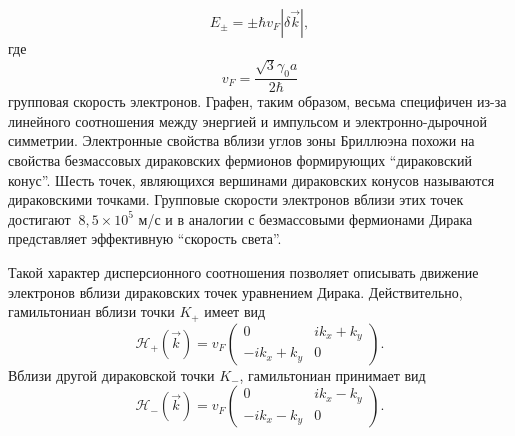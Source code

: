 \[
    E_\pm = \pm \hbar v_F |\delta\vec{k}|,
\]
где
\[
    v_F=\frac{\sqrt{3}\gamma_0 a}{2\hbar}
\]
групповая скорость электронов. Графен, таким образом, весьма специфичен из-за линейного соотношения между энергией и импульсом и электронно-дырочной симметрии. Электронные свойства вблизи углов зоны Бриллюэна похожи на свойства безмассовых дираковских фермионов формирующих ``дираковский конус''. Шесть точек, являющихся вершинами дираковских конусов называются дираковскими точками. Групповые скорости электронов вблизи этих точек достигают  \(~8,\!5\times10^5\) м/с и в аналогии с безмассовыми фермионами Дирака представляет эффективную ``скорость света''.

Такой характер дисперсионного соотношения позволяет описывать движение электронов вблизи дираковских точек уравнением Дирака. Действительно, гамильтониан вблизи точки \( K_+ \) имеет вид
\begin{equation}
      \mathcal{H}_+(\vec{k}) = 
      v_F
    \begin{pmatrix}
        0 & ik_x + k_y\\
        -ik_x + k_y & 0
    \end{pmatrix}.
    \label{eq:hamiltonian}
\end{equation}
Вблизи другой дираковской точки \( K_- \), гамильтониан принимает вид
\begin{equation*}
      \mathcal{H}_-(\vec{k}) = 
      v_F
    \begin{pmatrix}
        0 & ik_x - k_y\\
        -ik_x - k_y & 0
    \end{pmatrix}.
\end{equation*}

